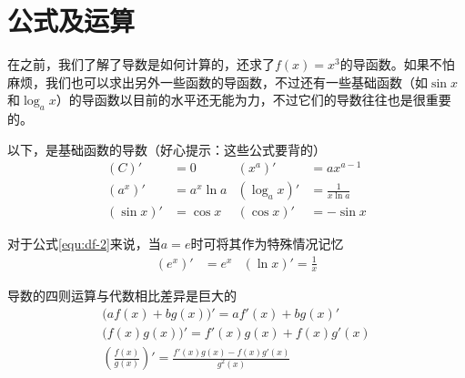 \section{公式及运算}
在之前，我们了解了导数是如何计算的，还求了$f(x)=x^3$的导函数。如果不怕麻烦，我们也可以求出另外一些函数的导函数，不过还有一些基础函数（如$\sin x$和$\log_ax$）的导函数以目前的水平还无能为力，不过它们的导数往往也是很重要的。

以下，是基础函数的导数（好心提示：这些公式要背的）
\begin{align}
    (C)'&=0 & (x^a)'&=ax^{a-1} \label{equ:df-1} \\
    (a^x)'&=a^x\ln a & (\log_ax)'&=\frac{1}{x\ln a} \label{equ:df-2} \\
    (\sin x)'&=\cos x & (\cos x)'&=-\sin x \label{equ:df-3}
\end{align}

对于公式\eqref{equ:df-2}来说，当$a=e$时可将其作为特殊情况记忆
\begin{align*}
    (e^x)'&=e^x & (\ln x)'=\frac{1}{x}
\end{align*}

导数的四则运算与代数相比差异是巨大的
\begin{gather}
    \big(af(x)+bg(x)\big)'=af'(x)+bg(x)' \label{equ:drule-1} \\
    \big(f(x)g(x)\big)'=f'(x)g(x)+f(x)g'(x) \label{equ:drule-2} \\
	\left(\frac{f(x)}{g(x)}\right)'=\frac{f'(x)g(x)-f(x)g'(x)}{g^2(x)} \label{equ:drule-3}
\end{gather}

